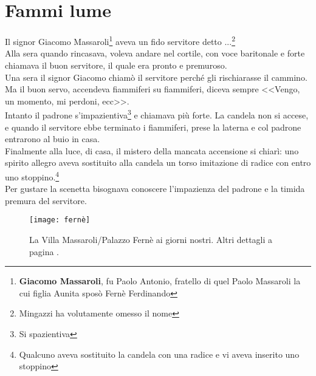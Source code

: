
\chapter{Fammi lume}
Il signor Giacomo Massaroli\footnote{\textbf{Giacomo Massaroli}, fu Paolo Antonio, fratello di quel  Paolo Massaroli la cui figlia Aunita sposò Fernè Ferdinando} aveva un fido servitore detto ...\footnote{Mingazzi ha volutamente omesso il nome}\\
Alla sera quando rincasava, voleva andare nel cortile, con voce baritonale e forte chiamava il buon servitore, il quale era pronto e premuroso.\\
\indent Una sera il signor Giacomo chiamò il servitore perché gli rischiarasse il cammino. Ma il buon servo, accendeva fiammiferi su fiammiferi, diceva sempre <<Vengo, un momento, mi perdoni, ecc>>.\\
\indent Intanto il padrone s'impazientiva\footnote{Si spazientiva} e chiamava più forte. La candela non si accese, e quando il servitore ebbe terminato i fiammiferi, prese la laterna e col padrone entrarono al buio in casa.\\
\indent Finalmente alla luce, di casa, il mistero della mancata accensione si chiarì: uno spirito allegro aveva sostituito alla candela un torso imitazione di radice con entro uno stoppino.\footnote{Qualcuno aveva sostituito la candela con una radice e vi aveva inserito uno stoppino}\\
\indent Per gustare la scenetta bisognava conoscere l'impazienza del padrone e la timida premura del servitore.


\begin{figure}[htb]
    \centering
    \texttt{[image: fernè]}
    \caption*{La Villa Massaroli/Palazzo Fernè ai giorni nostri. Altri dettagli a pagina \pageref{fig:villamassaroli}. \label{fig:ferne}}
\end{figure}